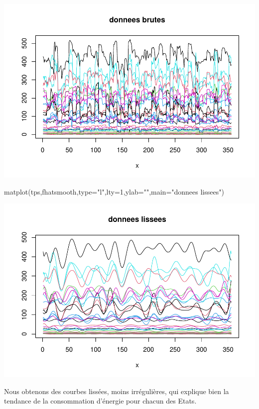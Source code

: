 \documentclass[
]{article}
\newenvironment{Shaded}{\begin{snugshade}}{\end{snugshade}}
\newcommand{\AttributeTok}[1]{\textcolor[rgb]{0.77,0.63,0.00}{#1}}
\newcommand{\DecValTok}[1]{\textcolor[rgb]{0.00,0.00,0.81}{#1}}
\newcommand{\FunctionTok}[1]{\textcolor[rgb]{0.00,0.00,0.00}{#1}}
\newcommand{\NormalTok}[1]{#1}
\newcommand{\StringTok}[1]{\textcolor[rgb]{0.31,0.60,0.02}{#1}}
\begin{document}
\includegraphics{Projet_CHESNAIS_GUIBERT_files/figure-latex/unnamed-chunk-31-1.pdf}

\begin{Shaded}
\begin{Highlighting}[]
\FunctionTok{matplot}\NormalTok{(tps,fhatsmooth,}\AttributeTok{type=}\StringTok{"l"}\NormalTok{,}\AttributeTok{lty=}\DecValTok{1}\NormalTok{,}\AttributeTok{ylab=}\StringTok{""}\NormalTok{,}\AttributeTok{main=}\StringTok{"donnees lissees"}\NormalTok{)}
\end{Highlighting}
\end{Shaded}

\includegraphics{Projet_CHESNAIS_GUIBERT_files/figure-latex/unnamed-chunk-31-2.pdf}

Nous obtenons des courbes lissées, moins irrégulières, qui explique bien
la tendance de la consommation d'énergie pour chacun des Etats.
\end{document}
